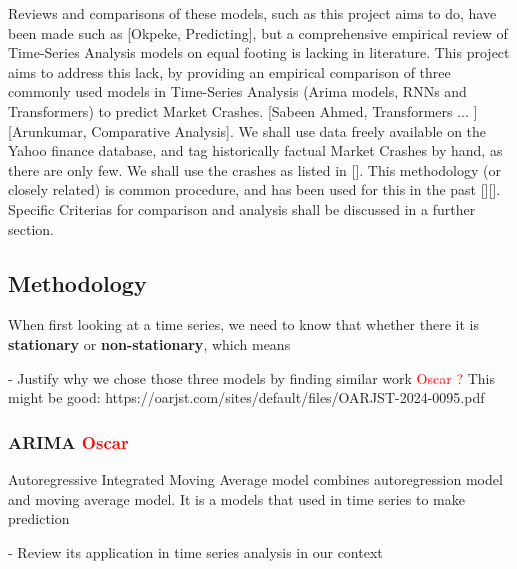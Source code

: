 \documentclass[12pt, letterpaper]{article}
\begin{document}
Reviews and comparisons of these models, such as this project aims to do, have been made such as [Okpeke, Predicting], but a comprehensive empirical review of Time-Series Analysis models on equal footing is lacking in literature. 
This project aims to address this lack, by providing an empirical comparison of three commonly used models in Time-Series Analysis (Arima models, RNNs and Transformers) to predict Market Crashes. [Sabeen Ahmed, Transformers ... ] [Arunkumar, Comparative Analysis]. 
We shall use data freely available on the Yahoo finance database, and tag historically factual Market Crashes by hand, as there are only few. We shall use the crashes as listed in []. This methodology (or closely related) is common procedure, and has been used for this in the past [][]. Specific Criterias for comparison and analysis shall be discussed in a further section.






\subsection*{Methodology}
When first looking at a time series, we need to know that whether there it is \textbf{stationary} or \textbf{non-stationary}, which means 

- Justify why we chose those three models by finding similar work \textcolor{red}{Oscar ?} This might be good: https://oarjst.com/sites/default/files/OARJST-2024-0095.pdf
    \subsubsection*{ARIMA \textcolor{red}{Oscar}}
    Autoregressive Integrated Moving Average model combines autoregression model and moving average model. It is a models that used in time series to make prediction

    - Review its application in time series analysis in our context
\end{document}
